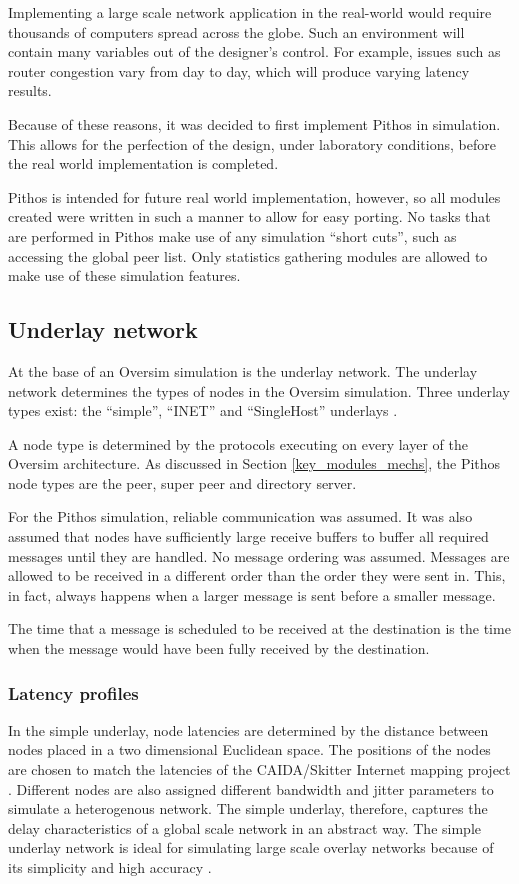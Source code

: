 Implementing a large scale network application in the real-world would require thousands of computers spread across the globe. Such an environment will contain many variables out of the designer's control. For example, issues such as router congestion vary from day to day, which will produce varying latency results.

Because of these reasons, it was decided to first implement Pithos in simulation. This allows for the perfection of the design, under laboratory conditions, before the real world implementation is completed.

Pithos is intended for future real world implementation, however, so all modules created were written in such a manner to allow for easy porting. No tasks that are performed in Pithos make use of any simulation ``short cuts'', such as accessing the global peer list. Only statistics gathering modules are allowed to make use of these simulation features.

\subsection{Underlay network}
\label{oversim_underlay}

At the base of an Oversim simulation is the underlay network. The underlay network determines the types of nodes in the Oversim simulation. Three underlay types exist: the ``simple'', ``INET'' and ``SingleHost'' underlays \cite{oversim_applications}.

A node type is determined by the protocols executing on every layer of the Oversim architecture. As discussed in Section \ref{key_modules_mechs}, the Pithos node types are the peer, super peer and directory server.

For the Pithos simulation, reliable communication was assumed. It was also assumed that nodes have sufficiently large receive buffers to buffer all required messages until they are handled. No message ordering was assumed. Messages are allowed to be received in a different order than the order they were sent in. This, in fact, always happens when a larger message is sent before a smaller message.

The time that a message is scheduled to be received at the destination is the time when the message would have been fully received by the destination.

\subsubsection{Latency profiles}
In the simple underlay, node latencies are determined by the distance between nodes placed in a two dimensional Euclidean space. The positions of the nodes are chosen to match the latencies of the CAIDA/Skitter Internet mapping project \cite{caida_skitter}. Different nodes are also assigned different bandwidth and jitter parameters to simulate a heterogenous network. The simple underlay, therefore, captures the delay characteristics of a global scale network in an abstract way. The simple underlay network is ideal for simulating large scale overlay networks because of its simplicity and high accuracy \cite{oversim_applications}.

